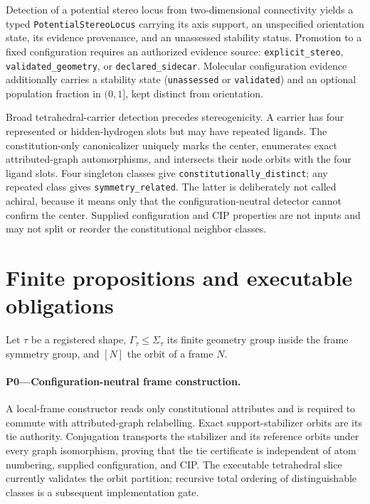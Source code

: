 \documentclass[pdflatex,sn-mathphys-num,referee,lineno]{sn-jnl}
\newcommand{\code}[1]{\texttt{#1}}
\theoremstyle{plain}
\theoremstyle{remark}
\theoremstyle{definition}
\begin{document}
Detection of a potential stereo locus from two-dimensional connectivity yields
a typed \code{PotentialStereoLocus} carrying its axis support, an unspecified
orientation state, its evidence provenance, and an unassessed stability status.
Promotion to a fixed configuration requires an authorized evidence source:
\code{explicit\_stereo}, \code{validated\_geometry}, or
\code{declared\_sidecar}.  Molecular configuration evidence additionally
carries a stability state (\code{unassessed} or \code{validated}) and an
optional population fraction in \((0,1]\), kept distinct from orientation.

Broad tetrahedral-carrier detection precedes stereogenicity.  A carrier has
four represented or hidden-hydrogen slots but may have repeated ligands.  The
constitution-only canonicalizer uniquely marks the center, enumerates exact
attributed-graph automorphisms, and intersects their node orbits with the four
ligand slots.  Four singleton classes give
\code{constitutionally\_distinct}; any repeated class gives
\code{symmetry\_related}.  The latter is deliberately not called achiral,
because it means only that the configuration-neutral detector cannot confirm
the center.  Supplied configuration and CIP properties are not inputs and may
not split or reorder the constitutional neighbor classes.

\section{Finite propositions and executable obligations}

Let \(\tau\) be a registered shape, \(\Gamma_\tau\leq\Sigma_\tau\) its finite
geometry group inside the frame symmetry group, and \([N]\) the orbit of a
frame \(N\).

\paragraph{P0---Configuration-neutral frame construction.}
A local-frame constructor reads only constitutional attributes and is required
to commute with attributed-graph relabelling.  Exact support-stabilizer orbits
are its tie authority.  Conjugation transports the stabilizer and its reference
orbits under every graph isomorphism, proving that the tie certificate is
independent of atom numbering, supplied configuration, and CIP.  The executable
tetrahedral slice currently validates the orbit partition; recursive total
ordering of distinguishable classes is a subsequent implementation gate.
\end{document}
